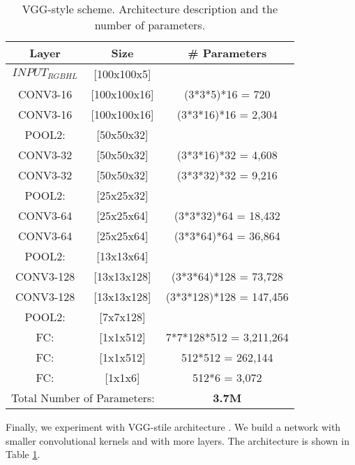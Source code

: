 \documentclass[review,12pt,3p]{elsarticle}
\begin{document}
\begin{table}[!ht]
\centering
\scriptsize
\begin{tabular}{  c  c | c}

        Layer   &   Size  & \# Parameters \\
               \hline
$INPUT_{RGBHL}$  & [100x100x5]  		&      \\
CONV3-16 & [100x100x16] 		&   (3*3*5)*16 	  =      720 \\
CONV3-16& [100x100x16]  	&   (3*3*16)*16   =    2,304 \\
POOL2:   &  [50x50x32] 		&    \\
CONV3-32&  [50x50x32] 		&   (3*3*16)*32   =    4,608\\
CONV3-32&  [50x50x32] 		&   (3*3*32)*32   =    9,216\\
POOL2:   &  [25x25x32] 		&   \\
CONV3-64&  [25x25x64] 		&   (3*3*32)*64   =   18,432\\
CONV3-64 & [25x25x64] 		&   (3*3*64)*64   =   36,864\\
POOL2:    & [13x13x64] 		&   \\
CONV3-128 &[13x13x128] 		&   (3*3*64)*128  =   73,728\\
CONV3-128 &[13x13x128] 		&   (3*3*128)*128 =  147,456\\
POOL2:  &    [7x7x128] 		&   \\
FC:      &   [1x1x512] 		&   7*7*128*512   = 3,211,264\\
FC:      &   [1x1x512] 		&   512*512 	  =   262,144\\
FC:      &   [1x1x6]		&   512*6 	  =     3,072\\
\hline
\multicolumn{2}{c}{ Total Number of Parameters:} & \textbf{3.7M} \\

\end{tabular}

\caption{VGG-style scheme. Architecture description and the number of parameters.}

\label{tab:vggStyle}
\end{table}

Finally, we experiment with VGG-stile architecture \cite{DBLP:journals/corr/SimonyanZ14a}. We build a network with smaller convolutional kernels and with more layers. The architecture is shown in Table \ref{tab:vggStyle}.
\end{document}
